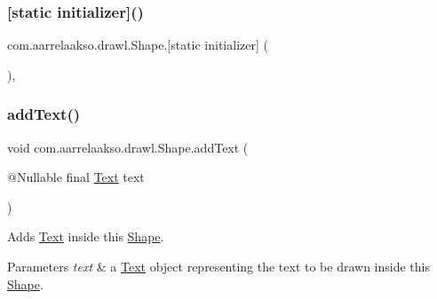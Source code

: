 \subsubsection{\texorpdfstring{[static initializer]()}{[static initializer]()}}
{\footnotesize\ttfamily com.\+aarrelaakso.\+drawl.\+Shape.\mbox{[}static initializer\mbox{]} (\begin{DoxyParamCaption}{ }\end{DoxyParamCaption})\hspace{0.3cm}{\ttfamily [static]}, {\ttfamily [package]}}

\mbox{\label{classcom_1_1aarrelaakso_1_1drawl_1_1_shape_af6fea9610721de462c18ee640043aba7}} 
\subsubsection{\texorpdfstring{add\+Text()}{addText()}}
{\footnotesize\ttfamily void com.\+aarrelaakso.\+drawl.\+Shape.\+add\+Text (\begin{DoxyParamCaption}\item[{@Nullable final \hyperlink{classcom_1_1aarrelaakso_1_1drawl_1_1_text}{Text}}]{text }\end{DoxyParamCaption})}



Adds \hyperlink{classcom_1_1aarrelaakso_1_1drawl_1_1_text}{Text} inside this \hyperlink{classcom_1_1aarrelaakso_1_1drawl_1_1_shape}{Shape}. 


\begin{DoxyParams}{Parameters}
{\em text} & a \hyperlink{classcom_1_1aarrelaakso_1_1drawl_1_1_text}{Text} object representing the text to be drawn inside this \hyperlink{classcom_1_1aarrelaakso_1_1drawl_1_1_shape}{Shape}. \\
\hline
\end{DoxyParams}
\mbox{\label{classcom_1_1aarrelaakso_1_1drawl_1_1_shape_acebea2aa57031322323c9bf50ee447db}} 
